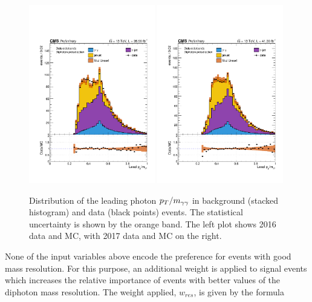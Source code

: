 \begin{figure}[hptb]
  \centering
  \includegraphics[width=0.49\textwidth]{Figures/Categorisation/leadptom_2016.pdf}
  \includegraphics[width=0.49\textwidth]{Figures/Categorisation/leadptom_2017.pdf}
  \caption[Leading photon scaled \pt distributions.]
  {
    Distribution of the leading photon $p_T/m_{\gamma\gamma}$ in background (stacked histogram) 
    and data (black points) events.
    The statistical uncertainty is shown by the orange band.
    The left plot shows 2016 data and MC,
    with 2017 data and MC on the right.
  }
  \label{fig:cat_ptominput}
\end{figure}

None of the input variables above encode the preference for events with good mass resolution.
For this purpose, an additional weight is applied to signal events which increases the relative 
importance of events with better values of the diphoton mass resolution. 
The weight applied, $w_{res}$, is given by the formula


